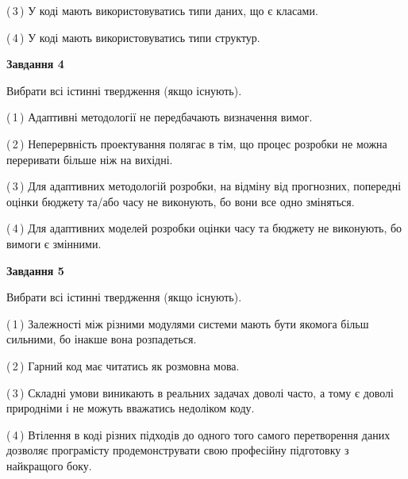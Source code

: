 \documentclass[10pt, ukrainian]{article}
\begin{document}
{\begin {large}
(\,3\,) У коді мають використовуватись типи даних, що є класами. %



(\,4\,) У коді мають використовуватись типи структур. %


{\begin {center}\textbf{Завдання 4}\end {center}}\par
Вибрати всі істинні твердження (якщо існують).\par
\vspace{2mm}



(\,1\,) Адаптивні методології не передбачають визначення вимог. %



(\,2\,) Неперервність проектування полягає в тім, що процес розробки не можна переривати більше ніж на вихідні. %



(\,3\,) Для адаптивних методологій розробки, на відміну від прогнозних, попередні оцінки бюджету та/або часу не виконують, бо вони все одно зміняться. %



(\,4\,) Для адаптивних моделей розробки оцінки часу та бюджету не виконують, бо вимоги є змінними. %


{\begin {center}\textbf{Завдання 5}\end {center}}\par
Вибрати всі істинні твердження (якщо існують).\par
\vspace{2mm}



(\,1\,) Залежності між різними модулями системи мають бути якомога більш сильними, бо інакше вона розпадеться. %



(\,2\,) Гарний код має читатись як розмовна мова. %



(\,3\,) Складні умови виникають в реальних задачах доволі часто, а тому є доволі природніми і не можуть вважатись недоліком коду. %



(\,4\,) Втілення в коді різних підходів до одного того самого перетворення даних дозволяє програмісту продемонструвати свою професійну підготовку з найкращого боку. %

\newpage


\end{large}}
\end{document}

